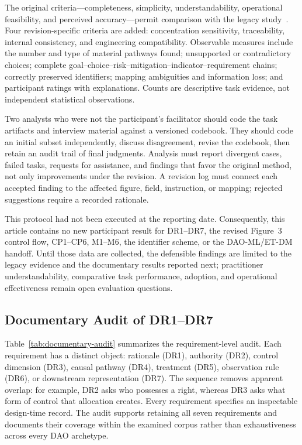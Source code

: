 \documentclass[referee,sn-basic]{sn-jnl}
\begin{document}
The original criteria---completeness, simplicity, understandability,
operational feasibility, and perceived accuracy---permit comparison with the
legacy study~\cite{Prat2015}. Four revision-specific criteria are added:
concentration sensitivity, traceability, internal consistency, and engineering
compatibility. Observable measures include the number and type of material
pathways found; unsupported or contradictory choices; complete
goal--choice--risk--mitigation--indicator--requirement chains; correctly
preserved identifiers; mapping ambiguities and information loss; and
participant ratings with explanations. Counts are descriptive task evidence,
not independent statistical observations.

Two analysts who were not the participant's facilitator should code the task
artifacts and interview material against a versioned codebook. They should code
an initial subset independently, discuss disagreement, revise the codebook,
then retain an audit trail of final judgments. Analysis must report divergent
cases, failed tasks, requests for assistance, and findings that favor the
original method, not only improvements under the revision. A revision log must
connect each accepted finding to the affected figure, field, instruction, or
mapping; rejected suggestions require a recorded rationale.

This protocol had not been executed at the reporting date. Consequently, this
article contains no new participant result for DR1--DR7, the revised Figure~3
control flow, CP1--CP6, M1--M6, the identifier scheme, or the DAO-ML/ET-DM
handoff. Until those data are collected, the defensible findings are limited to
the legacy evidence and the documentary results reported next; practitioner
understandability, comparative task performance, adoption, and operational
effectiveness remain open evaluation questions.

\subsection{Documentary Audit of DR1--DR7}
\label{subsec:results-requirements}

Table~\ref{tab:documentary-audit} summarizes the requirement-level audit. Each
requirement has a distinct object: rationale (DR1), authority (DR2), control
dimension (DR3), causal pathway (DR4), treatment (DR5), observation rule (DR6),
or downstream representation (DR7). The sequence removes apparent overlap:
for example, DR2 asks who possesses a right, whereas DR3 asks what form of
control that allocation creates. Every requirement specifies an inspectable
design-time record. The audit supports retaining all seven requirements and
documents their coverage within the examined corpus rather than exhaustiveness
across every DAO archetype.
\end{document}
